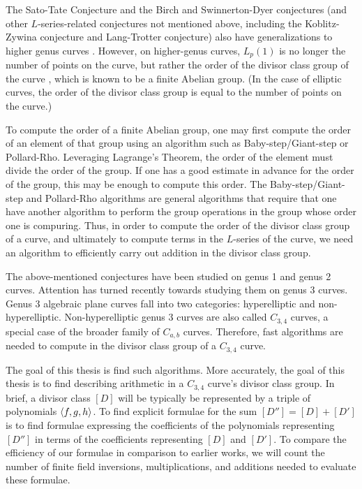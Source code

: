 The Sato-Tate Conjecture and the Birch and Swinnerton-Dyer conjectures
(and other $L$-series-related conjectures not mentioned above,
including the Koblitz-Zywina conjecture and Lang-Trotter conjecture)
also have generalizations to higher genus curves \cite{sutherland16} \cite{sutherland18}.
However, on higher-genus curves, $L_p(1)$ is no longer the number of points on the curve,
but rather the order of the divisor class group of the curve \cite{kedlaya08},
which is known to be a finite Abelian group.
(In the case of elliptic curves, the order of the divisor class group is
equal to the number of points on the curve.)

To compute the order of a finite Abelian group, one may first compute the order of an element of that group
using an algorithm such as Baby-step/Giant-step or Pollard-Rho.
Leveraging Lagrange's Theorem, the order of the element must divide the order of the group.
If one has a good estimate in advance for the order of the group, this may be enough
to compute this order.
The Baby-step/Giant-step and Pollard-Rho algorithms are general algorithms that
require that one have another algorithm to perform the group operations in the group
whose order one is compuring.
Thus, in order to compute the order of the divisor class group of a curve,
and ultimately to compute terms in the $L$-series of the curve,
we need an algorithm to efficiently carry out addition in the divisor class group.

The above-mentioned conjectures have been studied on genus 1 and genus 2 curves.
Attention has turned recently towards studying them on genus 3 curves.
Genus 3 algebraic plane curves fall into two categories: hyperelliptic and non-hyperelliptic.
Non-hyperelliptic genus 3 curves are also called $C_{3,4}$ curves, a special case of the broader family of $C_{a,b}$ curves.
Therefore, fast algorithms are needed to compute in the divisor class group of a $C_{3,4}$ curve.

The goal of this thesis is find such algorithms.
More accurately, the goal of this thesis is to find  describing arithmetic in a $C_{3,4}$ curve's divisor class group.
In brief, a divisor class $[D]$ will be typically be represented by a triple of polynomials $\left\langle f,g,h \right\rangle$.
To find explicit formulae for the sum $[D''] = [D] + [D']$ is to find formulae expressing the coefficients of the
polynomials representing $[D'']$ in terms of the coefficients representing $[D]$ and $[D']$.
To compare the efficiency of our formulae in comparison to earlier works,
we will count the number of finite field inversions, multiplications, and additions needed to evaluate these formulae.



